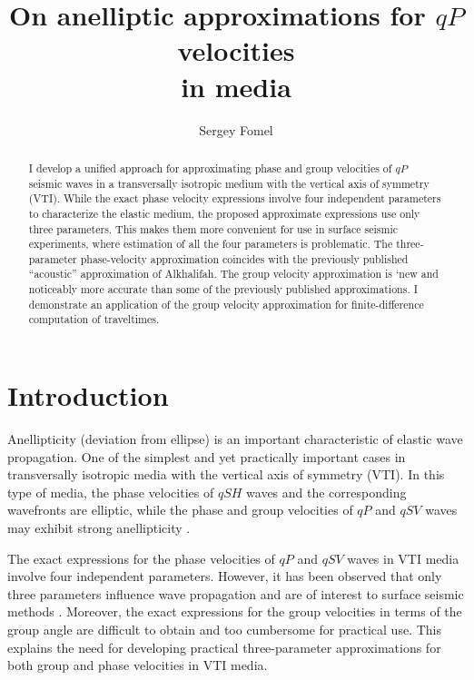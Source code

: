 \title{On anelliptic approximations for $qP$ velocities \\ in
 media}

\author{Sergey Fomel}

\begin{abstract}
I develop a unified approach for approximating phase and group
  velocities of $qP$ seismic waves in a transversally isotropic medium
  with the vertical axis of symmetry (VTI). While the exact phase
  velocity expressions involve four independent parameters to
  characterize the elastic medium, the proposed approximate
  expressions use only three parameters. This makes them more
  convenient for use in surface seismic experiments, where estimation
  of all the four parameters is problematic. The three-parameter
  phase-velocity approximation coincides with the previously published
  ``acoustic'' approximation of Alkhalifah. The group velocity
  approximation is `new and noticeably more accurate than some of the
  previously published approximations. I demonstrate an application of
  the group velocity approximation for finite-difference computation
  of traveltimes.
\end{abstract}

\section{Introduction}

Anellipticity (deviation from ellipse) is an important characteristic of
elastic wave propagation. One of the simplest and yet practically important
cases  in transversally isotropic media with
the vertical axis of symmetry (VTI). In this type of media, the phase
velocities of $qSH$ waves and the corresponding wavefronts are elliptic, while
the phase and group velocities of $qP$ and $qSV$ waves may exhibit strong
anellipticity \cite[]{tsvankin}.

The exact expressions for the phase velocities of $qP$ and $qSV$ waves in VTI
media involve four independent parameters. However, it has been observed that
only three parameters influence wave propagation 
and are of interest to surface seismic methods
\cite[]{GEO60-05-15501566}. Moreover, the exact expressions for the group
velocities in terms of the group angle are difficult to obtain and too
cumbersome for practical use. This explains the need for developing practical
three-parameter approximations for both group and phase velocities in VTI
media.

